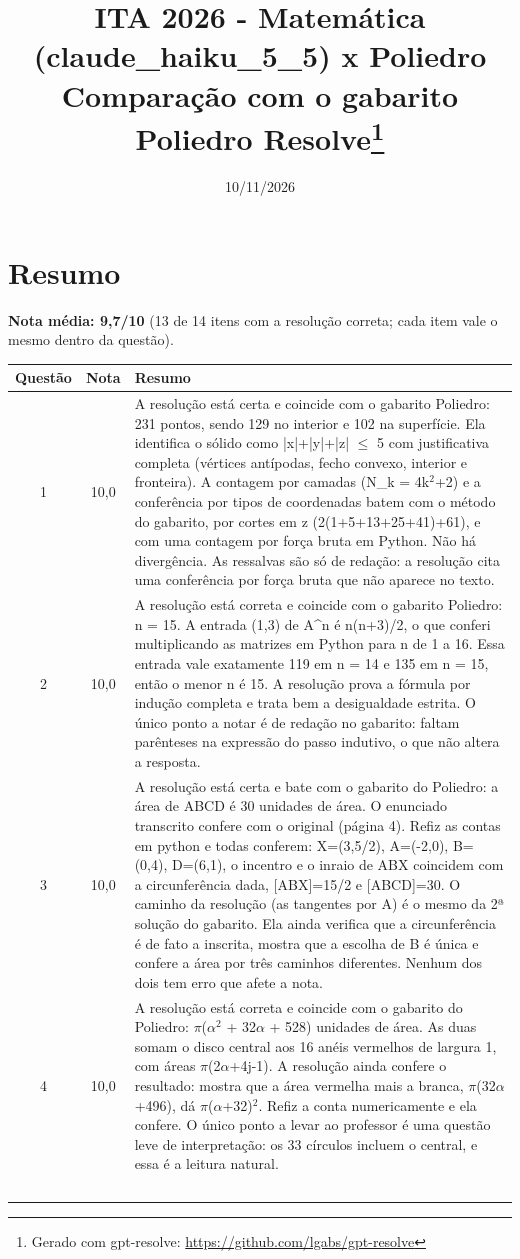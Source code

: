 \documentclass{article}%
\title{ITA 2026 {-} Matemática (claude\_haiku\_5\_5) x Poliedro\\[4pt]\large Comparação com o gabarito Poliedro Resolve\thanks{Gerado com gpt-resolve: \url{https://github.com/lgabs/gpt-resolve}}}%
\date{10/11/2026}%
\begin{document}
%
\normalsize%
\maketitle%
\section*{Resumo}\textbf{Nota média: 9,7/10} (13 de 14 itens com a resolução correta; cada item vale o mesmo dentro da questão).\par\medskip%
\begin{longtable}{@{}c c p{}@{}}\toprule Questão & Nota & Resumo \\ \midrule
1 & 10,0 & A resolução está certa e coincide com o gabarito Poliedro: 231 pontos, sendo 129 no interior e 102 na superfície. Ela identifica o sólido como |x|+|y|+|z| $\leq$ 5 com justificativa completa (vértices antípodas, fecho convexo, interior e fronteira). A contagem por camadas (N\_k = 4k$^2$+2) e a conferência por tipos de coordenadas batem com o método do gabarito, por cortes em z (2(1+5+13+25+41)+61), e com uma contagem por força bruta em Python. Não há divergência. As ressalvas são só de redação: a resolução cita uma conferência por força bruta que não aparece no texto. \\
2 & 10,0 & A resolução está correta e coincide com o gabarito Poliedro: n = 15. A entrada (1,3) de A\^{}n é n(n+3)/2, o que conferi multiplicando as matrizes em Python para n de 1 a 16. Essa entrada vale exatamente 119 em n = 14 e 135 em n = 15, então o menor n é 15. A resolução prova a fórmula por indução completa e trata bem a desigualdade estrita. O único ponto a notar é de redação no gabarito: faltam parênteses na expressão do passo indutivo, o que não altera a resposta. \\
3 & 10,0 & A resolução está certa e bate com o gabarito do Poliedro: a área de ABCD é 30 unidades de área. O enunciado transcrito confere com o original (página 4). Refiz as contas em python e todas conferem: X=(3,5/2), A=({-}2,0), B=(0,4), D=(6,1), o incentro e o inraio de ABX coincidem com a circunferência dada, {[}ABX{]}=15/2 e {[}ABCD{]}=30. O caminho da resolução (as tangentes por A) é o mesmo da 2ª solução do gabarito. Ela ainda verifica que a circunferência é de fato a inscrita, mostra que a escolha de B é única e confere a área por três caminhos diferentes. Nenhum dos dois tem erro que afete a nota. \\
4 & 10,0 & A resolução está correta e coincide com o gabarito do Poliedro: $\pi$($\alpha$$^2$ + 32$\alpha$ + 528) unidades de área. As duas somam o disco central aos 16 anéis vermelhos de largura 1, com áreas $\pi$(2$\alpha$+4j-1). A resolução ainda confere o resultado: mostra que a área vermelha mais a branca, $\pi$(32$\alpha$+496), dá $\pi$($\alpha$+32)$^2$. Refiz a conta numericamente e ela confere. O único ponto a levar ao professor é uma questão leve de interpretação: os 33 círculos incluem o central, e essa é a leitura natural. \\
$$
\end{longtable}
\end{document}
